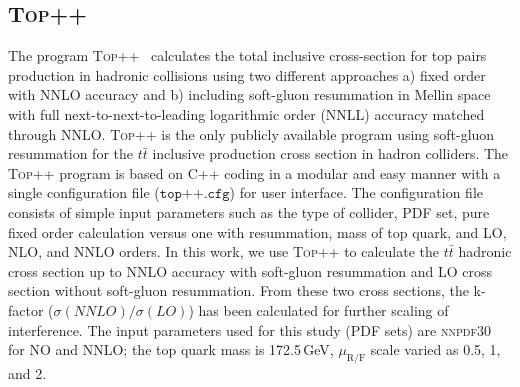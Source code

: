 \subsection{\textsc{Top++}}\label{subsec:top_pp}
The program \textsc{Top++}~\cite{Czakon:top_pp} calculates the total inclusive cross-section for top pairs production in hadronic collisions using two different approaches a) fixed order with NNLO accuracy and b) including soft-gluon resummation in Mellin space with full next-to-next-to-leading logarithmic order (NNLL) accuracy matched through NNLO. \textsc{Top++} is the only publicly available program using soft-gluon resummation for the $t\bar{t}$ inclusive production cross section in hadron colliders.
The \textsc{Top++} program is based on C++ coding in a modular and easy manner with a single configuration file ($\texttt{top++.cfg}$) for user interface. The configuration file consists of simple input parameters such as the type of collider, PDF set, pure fixed order calculation versus one with resummation, mass of top quark, and LO, NLO, and NNLO orders. In this work, we use \textsc{Top++} to calculate the $t\bar{t}$ hadronic cross section up to NNLO accuracy with soft-gluon resummation and LO cross section without soft-gluon resummation. From these two cross sections, the k-factor ($\sigma(NNLO)/\sigma(LO)$) has been calculated for further scaling of interference. The input parameters used for this study (PDF sets) are \textsc{nnpdf30} for NO and NNLO; the top quark mass is 172.5\,GeV, $\mu_{\text{R/F}}$ scale varied as 0.5, 1, and 2.  

  




\clearpage{\pagestyle{empty}\cleardoublepage}
